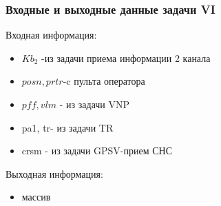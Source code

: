 \subsubsection{Входные и выходные данные задачи VI}
Входная информация:    
\begin{itemize}
\item $Kb_2$ -из задачи приема информации 2 канала
\item $posn, prtr$-c  пульта оператора
\item $pff, vlm$ - из задачи VNP
\item pa1, tr- из задачи TR
\item crsm - из задачи GPSV-прием СНС
\end{itemize}
Выходная информация:
\begin{itemize}
    \item массив %
\end{itemize}
